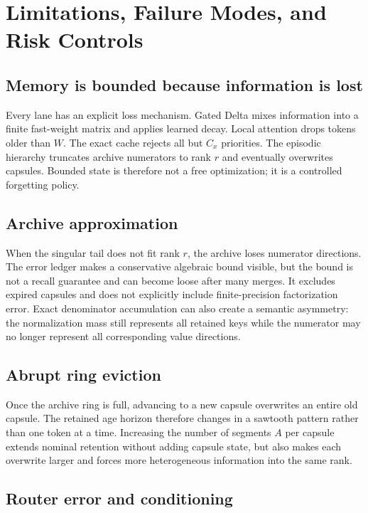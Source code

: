 \section{Limitations, Failure Modes, and Risk Controls}
\label{sec:limitations}

\subsection{Memory is bounded because information is lost}

Every lane has an explicit loss mechanism. Gated Delta mixes information into
a finite fast-weight matrix and applies learned decay. Local attention drops
tokens older than \(W\). The exact cache rejects all but \(C_x\) priorities.
The episodic hierarchy truncates archive numerators to rank \(r\) and
eventually overwrites capsules. Bounded state is therefore not a free
optimization; it is a controlled forgetting policy.

\subsection{Archive approximation}

When the singular tail does not fit rank \(r\), the archive loses numerator
directions. The error ledger makes a conservative algebraic bound visible, but
the bound is not a recall guarantee and can become loose after many merges.
It excludes expired capsules and does not explicitly include finite-precision
factorization error. Exact denominator accumulation can also create a semantic
asymmetry: the normalization mass still represents all retained keys while
the numerator may no longer represent all corresponding value directions.

\subsection{Abrupt ring eviction}

Once the archive ring is full, advancing to a new capsule overwrites an entire
old capsule. The retained age horizon therefore changes in a sawtooth pattern
rather than one token at a time. Increasing the number of segments \(A\) per
capsule extends nominal retention without adding capsule state, but also makes
each overwrite larger and forces more heterogeneous information into the same
rank.

\subsection{Router error and conditioning}

